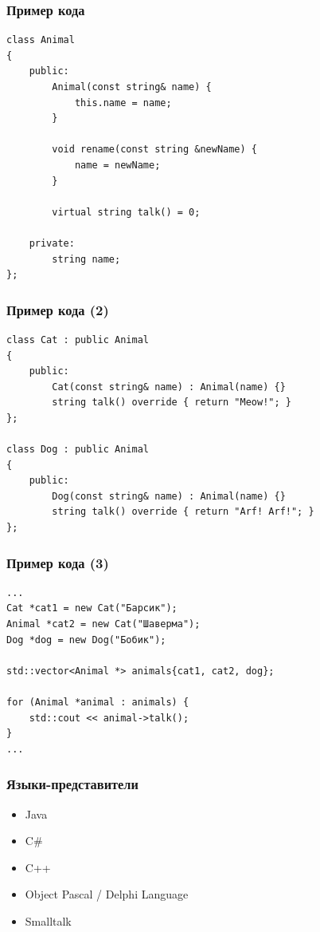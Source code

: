 \documentclass{../../slides-style}
\begin{document}
    \begin{frame}[fragile]
        \frametitle{Пример кода}
        \begin{verbatim}
class Animal
{
    public:
        Animal(const string& name) { 
            this.name = name; 
        }

        void rename(const string &newName) { 
            name = newName; 
        }

        virtual string talk() = 0;

    private:
        string name;
};
        \end{verbatim}
    \end{frame}

    \begin{frame}[fragile]
        \frametitle{Пример кода (2)}
        \begin{verbatim}
class Cat : public Animal
{
    public:
        Cat(const string& name) : Animal(name) {}
        string talk() override { return "Meow!"; }
};

class Dog : public Animal
{
    public:
        Dog(const string& name) : Animal(name) {}
        string talk() override { return "Arf! Arf!"; }
};
        \end{verbatim}
    \end{frame}

    \begin{frame}[fragile]
        \frametitle{Пример кода (3)}
        \begin{verbatim}
...
Cat *cat1 = new Cat("Барсик");
Animal *cat2 = new Cat("Шаверма");
Dog *dog = new Dog("Бобик");

std::vector<Animal *> animals{cat1, cat2, dog};

for (Animal *animal : animals) {
    std::cout << animal->talk();
}
...
        \end{verbatim}
    \end{frame}

    \begin{frame}
        \frametitle{Языки-представители}
        \begin{itemize}
            \item Java
            \item C\#
            \item C++
            \item Object Pascal / Delphi Language
            \item Smalltalk
        \end{itemize}
    \end{frame}
\end{document}
